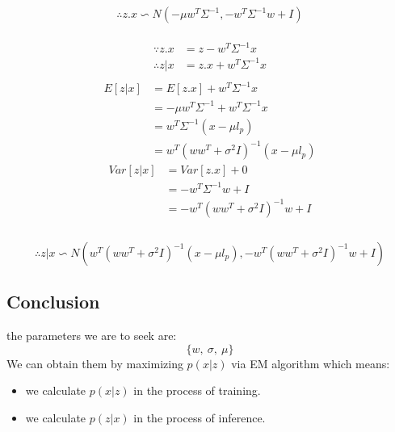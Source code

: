 \documentclass{report}
\begin{document}
\begin{equation}
\therefore z.x \backsim N(-\mu w^T \Sigma^{-1}, -w^T \Sigma^{-1} w + I)
\end{equation}\\
\begin{equation}
\begin{aligned}
\because 
z.x &= z - w^T \Sigma^{-1} x\\
\therefore 
z|x &= z.x + w^T \Sigma^{-1} x\\
\end{aligned}
\end{equation}
\begin{equation}
\begin{aligned}
E[z|x] 
&= E[z.x] + w^T \Sigma^{-1} x\\
&= -\mu w^T \Sigma^{-1} + w^T \Sigma^{-1} x\\
&= w^T \Sigma^{-1} (x - \mu l_p)\\
&= w^T (ww^T + \sigma^2 I)^{-1}(x - \mu l_p)
\end{aligned}
\end{equation}
\begin{equation}
\begin{aligned}
Var[z|x] 
&= Var[z.x] + 0\\
&= -w^T \Sigma^{-1} w + I\\
&= -w^T (ww^T + \sigma^2 I)^{-1} w + I\\
\end{aligned}
\end{equation}\\
\begin{equation}
\therefore
z|x \backsim N(w^T (ww^T + \sigma^2 I)^{-1}(x - \mu l_p), -w^T (ww^T + \sigma^2 I)^{-1} w + I)
\end{equation}
\subsection{Conclusion}
the parameters we are to seek are:
$$
\{ w, \ \sigma , \ \mu \}
$$
We can obtain them by maximizing $p(x|z)$ via EM algorithm which means:
\begin{itemize}
	\item we calculate $p(x|z)$ in the process of training.
	\item we calculate $p(z|x)$ in the process of inference.
\end{itemize}
\end{document}
